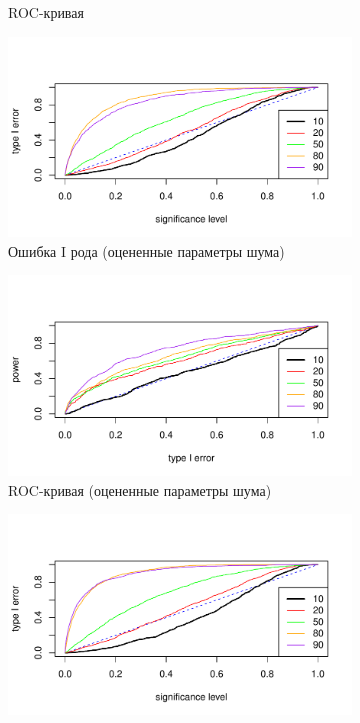 \documentclass[specialist,
substylefile = spbu_report.rtx,
subf,href,colorlinks=true, 12pt]{disser}
\theoremstyle{definition}
\begin{document}
\begin{figure}[h!]
\begin{subfigure}[t]{0.5\textwidth}
		\caption{ROC-кривая}
		\label{fig:trend_roc}
	\end{subfigure}
	\begin{subfigure}[t]{0.5\textwidth}
		\centering
		\includegraphics[width=\textwidth]{img/type1error_trend_est_noise.pdf}
		\caption{Ошибка I рода (оцененные параметры шума)}
		\label{fig:trend_est_noise_type1error}
	\end{subfigure}\hspace{\fill}
	\begin{subfigure}[t]{0.5\textwidth}
		\centering
		\includegraphics[width=\textwidth]{img/roc_trend_est_noise.pdf}
		\caption{ROC-кривая (оцененные параметры шума)}
		\label{fig:trend_est_noise_roc}
	\end{subfigure}
	\begin{subfigure}[t]{0.5\textwidth}
		\centering
		\includegraphics[width=\textwidth]{img/type1error_trend_est_noise_signal.pdf}

\end{subfigure}
\end{figure}
\end{document}
